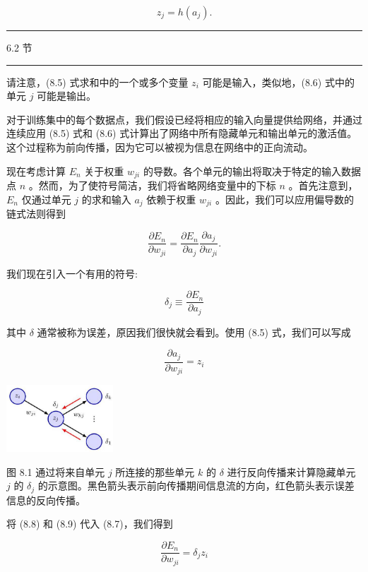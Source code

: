 \documentclass[10pt]{article}
\newcommand{\HRule}{\begin{center}\rule{0.9\linewidth}{0.2mm}\end{center}}
\begin{document}
\[
{z}_{j} = h\left( {a}_{j}\right) . \tag{8.6}
\]

\HRule

6.2 节

\HRule

请注意，(8.5) 式求和中的一个或多个变量 \({z}_{i}\) 可能是输入，类似地，(8.6) 式中的单元 \(j\) 可能是输出。

对于训练集中的每个数据点，我们假设已经将相应的输入向量提供给网络，并通过连续应用 (8.5) 式和 (8.6) 式计算出了网络中所有隐藏单元和输出单元的激活值。这个过程称为前向传播，因为它可以被视为信息在网络中的正向流动。

现在考虑计算 \({E}_{n}\) 关于权重 \({w}_{ji}\) 的导数。各个单元的输出将取决于特定的输入数据点 \(n\) 。然而，为了使符号简洁，我们将省略网络变量中的下标 \(n\) 。首先注意到， \({E}_{n}\) 仅通过单元 \(j\) 的求和输入 \({a}_{j}\) 依赖于权重 \({w}_{ji}\) 。因此，我们可以应用偏导数的链式法则得到

\[
\frac{\partial {E}_{n}}{\partial {w}_{ji}} = \frac{\partial {E}_{n}}{\partial {a}_{j}}\frac{\partial {a}_{j}}{\partial {w}_{ji}}. \tag{8.7}
\]

我们现在引入一个有用的符号:

\[
{\delta }_{j} \equiv  \frac{\partial {E}_{n}}{\partial {a}_{j}} \tag{8.8}
\]

其中 \(\delta\) 通常被称为误差，原因我们很快就会看到。使用 (8.5) 式，我们可以写成

\[
\frac{\partial {a}_{j}}{\partial {w}_{ji}} = {z}_{i} \tag{8.9}
\]

\begin{center}
\includegraphics[max width=0.3\textwidth]{images/0194e279-9b28-703a-88f4-c3ac21e2010d_255_1108_344_433_272_0.jpg}
\end{center}
\hspace*{3em} 

图 8.1 通过将来自单元 \(j\) 所连接的那些单元 \(k\) 的 \(\delta\) 进行反向传播来计算隐藏单元 \(j\) 的 \({\delta }_{j}\) 的示意图。黑色箭头表示前向传播期间信息流的方向，红色箭头表示误差信息的反向传播。

将 (8.8) 和 (8.9) 代入 (8.7)，我们得到

\[
\frac{\partial {E}_{n}}{\partial {w}_{ji}} = {\delta }_{j}{z}_{i} \tag{8.10}
\]
\end{document}
